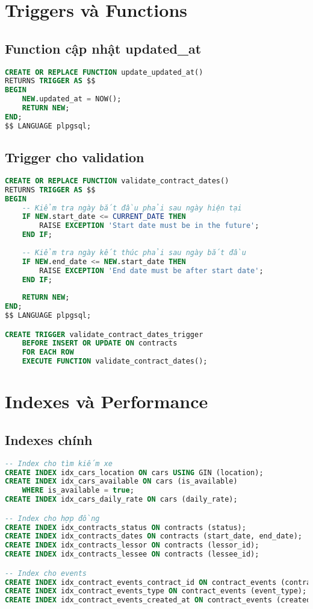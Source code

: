 \documentclass[12pt,a4paper]{article}
\begin{document}
\section{Triggers và Functions}

\subsection{Function cập nhật updated\_at}
\begin{lstlisting}[language=SQL, caption=Function tự động cập nhật timestamp]
CREATE OR REPLACE FUNCTION update_updated_at()
RETURNS TRIGGER AS $$
BEGIN
    NEW.updated_at = NOW();
    RETURN NEW;
END;
$$ LANGUAGE plpgsql;
\end{lstlisting}

\subsection{Trigger cho validation}
\begin{lstlisting}[language=SQL, caption=Trigger validation hợp đồng]
CREATE OR REPLACE FUNCTION validate_contract_dates()
RETURNS TRIGGER AS $$
BEGIN
    -- Kiểm tra ngày bắt đầu phải sau ngày hiện tại
    IF NEW.start_date <= CURRENT_DATE THEN
        RAISE EXCEPTION 'Start date must be in the future';
    END IF;
    
    -- Kiểm tra ngày kết thúc phải sau ngày bắt đầu
    IF NEW.end_date <= NEW.start_date THEN
        RAISE EXCEPTION 'End date must be after start date';
    END IF;
    
    RETURN NEW;
END;
$$ LANGUAGE plpgsql;

CREATE TRIGGER validate_contract_dates_trigger
    BEFORE INSERT OR UPDATE ON contracts
    FOR EACH ROW
    EXECUTE FUNCTION validate_contract_dates();
\end{lstlisting}

\section{Indexes và Performance}

\subsection{Indexes chính}
\begin{lstlisting}[language=SQL, caption=Các index quan trọng]
-- Index cho tìm kiếm xe
CREATE INDEX idx_cars_location ON cars USING GIN (location);
CREATE INDEX idx_cars_available ON cars (is_available) 
    WHERE is_available = true;
CREATE INDEX idx_cars_daily_rate ON cars (daily_rate);

-- Index cho hợp đồng
CREATE INDEX idx_contracts_status ON contracts (status);
CREATE INDEX idx_contracts_dates ON contracts (start_date, end_date);
CREATE INDEX idx_contracts_lessor ON contracts (lessor_id);
CREATE INDEX idx_contracts_lessee ON contracts (lessee_id);

-- Index cho events
CREATE INDEX idx_contract_events_contract_id ON contract_events (contract_id);
CREATE INDEX idx_contract_events_type ON contract_events (event_type);
CREATE INDEX idx_contract_events_created_at ON contract_events (created_at);
\end{lstlisting}
\end{document}

